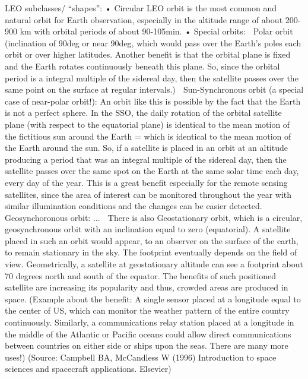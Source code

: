 LEO subclasses/ “shapes”:
•	Circular LEO orbit is the most common and natural orbit for Earth observation, especially in the altitude range of about 200-900 km with orbital periods of about 90-105min.
•	Special orbits:
	Polar orbit (inclination of 90deg or near 90deg, which would pass over the Earth's poles each orbit or over higher latitudes. Another benefit is that the orbital plane is fixed and the Earth rotates continuously beneath this plane. So, since the orbital period is a integral multiple of the sidereal day, then the satellite passes over the same point on the surface at regular intervals.)
	Sun-Synchronous orbit (a special case of near-polar orbit!):
An orbit like this is possible by the fact that the Earth is not a perfect sphere. In the SSO, the daily rotation of the orbital satellite plane (with respect to the equatorial plane) is identical to the mean motion of the fictitious sun around the Earth = which is identical to the mean motion of the Earth around the sun. So, if a satellite is placed in an orbit at an altitude producing a period that was an integral multiple of the sidereal day, then the satellite passes over the same spot on the Earth at the same solar time each day, every day of the year. This is a great benefit especially for the remote sensing satellites, since the area of interest can be monitored throughout the year with similar illumination conditions and the changes can be easier detected.
  Geosynchoronous orbit: ...
  There is also Geostationary orbit, which is a circular, geosynchronous orbit with an inclination equal to zero (equatorial). A satellite placed in such an orbit would appear, to an observer on the surface of the earth, to remain stationary in the sky. The footprint eventually depends on the field of view. Geometrically, a satellite at geostationary altitude can see a footprint about 70 degrees north and south of the equator. The benefits of such positioned satellite are increasing  its popularity and thus, crowded areas are produced in space. (Example about the benefit: A single sensor placed at a longitude equal to the center of US, which can monitor the weather pattern of the entire country continuously. Similarly, a communications relay station placed at a longitude in the middle of the Atlantic or Pacific oceans could allow direct communications between countries on either side or ships upon the seas. There are many more uses!)
(Source: Campbell BA, McCandless W (1996) Introduction to space sciences and spacecraft applications. Elsevier)

